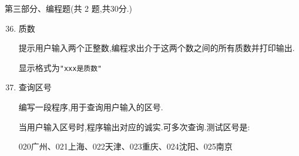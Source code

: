 \documentclass[11pt]{ctexart}
\begin{document}
    {\noindent\heiti 第三部分、编程题(共 2 题,共30分.)}
    \begin{enumerate}
        \setcounter{enumi}{35}
        
        \item 质数
        
        提示用户输入两个正整数,编程求出介于这两个数之间的所有质数并打印输出.
        
        显示格式为\lstinline!"xxx是质数"!
        \vfill

        \item 查询区号
        
        编写一段程序,用于查询用户输入的区号.

        当用户输入区号时,程序输出对应的诚实.可多次查询.测试区号是:

        020广州、021上海、022天津、023重庆、024沈阳、025南京
        \vfill
    \end{enumerate}
\end{document}
